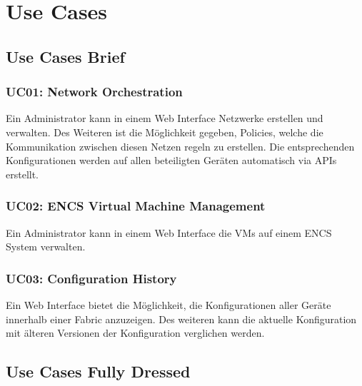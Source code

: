 \section{Use Cases} \label{usecases}

\subsection{Use Cases Brief}

\subsubsection{UC01: Network Orchestration}
Ein Administrator kann in einem Web Interface Netzwerke erstellen und verwalten. Des Weiteren ist die Möglichkeit gegeben, Policies, welche die Kommunikation zwischen diesen Netzen regeln zu erstellen. Die entsprechenden Konfigurationen werden auf allen beteiligten Geräten automatisch via APIs erstellt.

\subsubsection{UC02: ENCS Virtual Machine Management}
Ein Administrator kann in einem Web Interface die VMs auf einem ENCS System verwalten.

\subsubsection{UC03: Configuration History}
Ein Web Interface bietet die Möglichkeit, die Konfigurationen aller Geräte innerhalb einer Fabric anzuzeigen. Des weiteren kann die aktuelle Konfiguration mit älteren Versionen der Konfiguration verglichen werden.

\subsection{Use Cases Fully Dressed}

